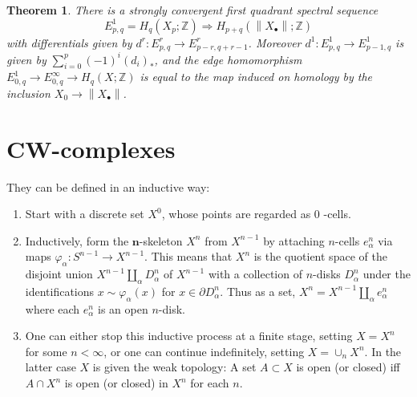 \documentclass{book}
\newtheorem{theo}{Theorem}
\begin{document}
\begin{theo}
    There is a strongly convergent first quadrant spectral sequence
    $$
    E_{p, q}^1=H_q\left(X_p ; \mathbb{Z}\right) \Longrightarrow H_{p+q}\left(\left\|X_{\bullet}\right\| ; \mathbb{Z}\right)
    $$
    with differentials given by $d^r: E_{p, q}^r \rightarrow E_{p-r, q+r-1}^r$. Moreover $d^1: E_{p, q}^1 \rightarrow E_{p-1, q}^1$ is given by $\sum_{i=0}^p(-1)^i\left(d_i\right)_*$, and the edge homomorphism $E_{0, q}^1 \rightarrow E_{0, q}^{\infty} \rightarrow H_q(X ; \mathbb{Z})$ is equal to the map induced on homology by the inclusion $X_0 \rightarrow\left\|X_{\bullet}\right\|$.   
\end{theo}







\section{CW-complexes}

They can be defined in an inductive way:

\begin{enumerate}
    \item Start with a discrete set $X^0$, whose points are regarded as 0 -cells.
    \item Inductively, form the $\boldsymbol{n}$-skeleton $X^n$ from $X^{n-1}$ by attaching $n$-cells $e_\alpha^n$ via maps $\varphi_\alpha: S^{n-1} \rightarrow X^{n-1}$. This means that $X^n$ is the quotient space of the disjoint union $X^{n-1} \amalg_\alpha D_\alpha^n$ of $X^{n-1}$ with a collection of $n$-disks $D_\alpha^n$ under the identifications $x \sim \varphi_\alpha(x)$ for $x \in \partial D_\alpha^n$. Thus as a set, $X^n=X^{n-1} \amalg_\alpha e_\alpha^n$ where each $e_\alpha^n$ is an open $n$-disk.
    \item One can either stop this inductive process at a finite stage, setting $X=X^n$ for some $n<\infty$, or one can continue indefinitely, setting $X=\cup_n X^n$. In the latter case $X$ is given the weak topology: A set $A \subset X$ is open (or closed) iff $A \cap X^n$ is open (or closed) in $X^n$ for each $n$.
    
\end{enumerate}
\end{document}
